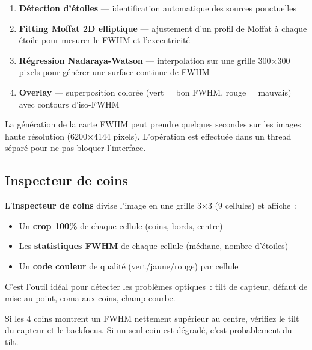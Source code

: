 \documentclass[a4paper,11pt]{article}
\begin{document}
\begin{enumerate}
    \item \textbf{D\'{e}tection d'\'{e}toiles} --- identification automatique des sources ponctuelles
    \item \textbf{Fitting Moffat 2D elliptique} --- ajustement d'un profil de Moffat \`{a} chaque \'{e}toile pour mesurer le FWHM et l'excentricit\'{e}
    \item \textbf{R\'{e}gression Nadaraya-Watson} --- interpolation sur une grille 300$\times$300 pixels pour g\'{e}n\'{e}rer une surface continue de FWHM
    \item \textbf{Overlay} --- superposition color\'{e}e (vert = bon FWHM, rouge = mauvais) avec contours d'iso-FWHM
\end{enumerate}

\begin{warningbox}
La g\'{e}n\'{e}ration de la carte FWHM peut prendre quelques secondes sur les images haute r\'{e}solution (6200$\times$4144 pixels). L'op\'{e}ration est effectu\'{e}e dans un thread s\'{e}par\'{e} pour ne pas bloquer l'interface.
\end{warningbox}

\subsection{Inspecteur de coins}

L'\textbf{inspecteur de coins} divise l'image en une grille 3$\times$3 (9 cellules) et affiche~:

\begin{itemize}
    \item Un \textbf{crop 100\%} de chaque cellule (coins, bords, centre)
    \item Les \textbf{statistiques FWHM} de chaque cellule (m\'{e}diane, nombre d'\'{e}toiles)
    \item Un \textbf{code couleur} de qualit\'{e} (vert/jaune/rouge) par cellule
\end{itemize}

C'est l'outil id\'{e}al pour d\'{e}tecter les probl\`{e}mes optiques~: tilt de capteur, d\'{e}faut de mise au point, coma aux coins, champ courbe.

\begin{tipbox}
Si les 4 coins montrent un FWHM nettement sup\'{e}rieur au centre, v\'{e}rifiez le tilt du capteur et le backfocus. Si un seul coin est d\'{e}grad\'{e}, c'est probablement du tilt.
\end{tipbox}
\end{document}
